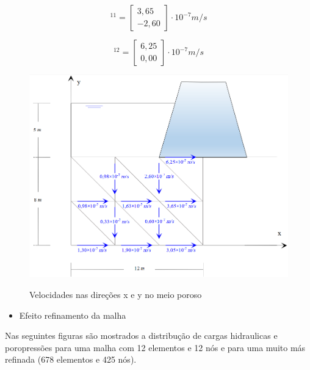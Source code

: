 \documentclass{article} %
\begin{document}
 \begin{equation}
[v]^{11}=\begin{bmatrix}
3,65\\
-2,60
\end{bmatrix}\cdot 10^{-7}m/s
\end{equation}

 \begin{equation}
[v]^{12}=\begin{bmatrix}
6,25\\
0,00
\end{bmatrix}\cdot 10^{-7}m/s
\end{equation}





\begin{figure}[H]
	\centering
	\caption{Velocidades nas direções x e y no meio poroso}
	\includegraphics[width=1\linewidth]{velocidade}	
	\label{velocidadefinal}	
\end{figure}






\begin{itemize}
	\item Efeito refinamento da malha
\end{itemize}

Nas seguintes figuras são mostrados a distribução de cargas hidraulicas e poropressões para uma malha com 12 elementos e 12 nós e para uma muito más refinada (678 elementos e 425 nós).
\end{document}
